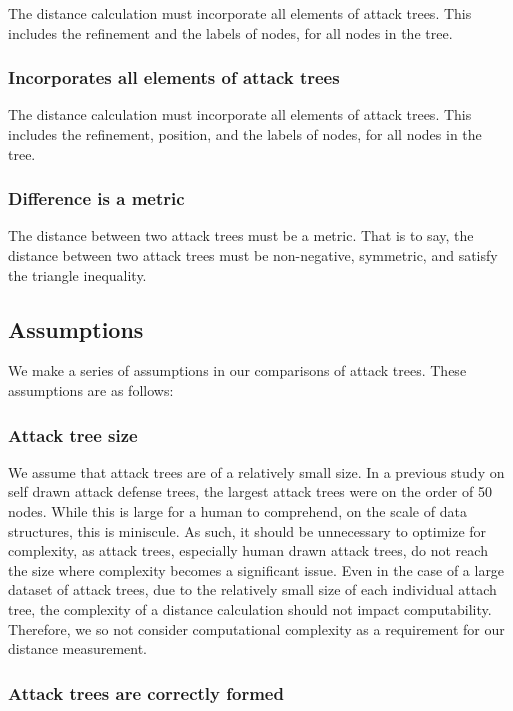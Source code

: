 The distance calculation must incorporate all elements of attack trees. This includes the refinement  and the labels of nodes, for all nodes in the tree.

\subsubsection{Incorporates all elements of attack trees}

The distance calculation must incorporate all elements of attack trees. This includes the refinement, position,  and the labels of nodes, for all nodes in the tree.

\subsubsection{Difference is a metric}

The distance between two attack trees must be a metric. That is to say, the distance between two attack trees must be non-negative, symmetric, and satisfy the triangle inequality.



\subsection{Assumptions}

We make a series of assumptions in our comparisons of attack trees. These assumptions are as follows:  

\subsubsection{Attack tree size}

We assume that attack trees are of a relatively small size. In a previous study on self drawn attack defense trees, the largest attack trees were on the order of 50 nodes. While this is large for a human to comprehend, on the scale of data structures, this is miniscule. As such, it should be unnecessary to optimize for complexity, as attack trees, especially human drawn attack trees, do not reach the size where complexity becomes a significant issue. Even in the case of a large dataset of attack trees, due to the relatively small size of each individual attach tree, the complexity of a distance calculation should not impact computability. Therefore, we so not consider computational complexity as a requirement for our distance measurement.

\subsubsection{Attack trees are correctly formed}

